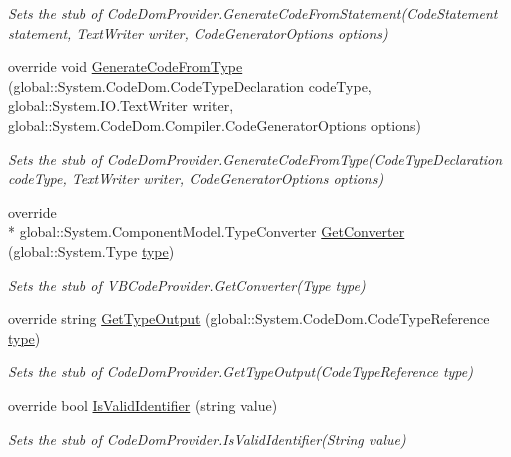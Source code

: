 \begin{DoxyCompactItemize}
\begin{DoxyCompactList}\small\item\em Sets the stub of Code\-Dom\-Provider.\-Generate\-Code\-From\-Statement(\-Code\-Statement statement, Text\-Writer writer, Code\-Generator\-Options options)\end{DoxyCompactList}\item 
override void \hyperlink{class_microsoft_1_1_visual_basic_1_1_fakes_1_1_stub_v_b_code_provider_ad29201c92d699bcfeaace4e2c91a1486}{Generate\-Code\-From\-Type} (global\-::\-System.\-Code\-Dom.\-Code\-Type\-Declaration code\-Type, global\-::\-System.\-I\-O.\-Text\-Writer writer, global\-::\-System.\-Code\-Dom.\-Compiler.\-Code\-Generator\-Options options)
\begin{DoxyCompactList}\small\item\em Sets the stub of Code\-Dom\-Provider.\-Generate\-Code\-From\-Type(\-Code\-Type\-Declaration code\-Type, Text\-Writer writer, Code\-Generator\-Options options)\end{DoxyCompactList}\item 
override \\*
global\-::\-System.\-Component\-Model.\-Type\-Converter \hyperlink{class_microsoft_1_1_visual_basic_1_1_fakes_1_1_stub_v_b_code_provider_aa2d7c13094445cc4c8d494b88de8f509}{Get\-Converter} (global\-::\-System.\-Type \hyperlink{jquery-1_810_82-vsdoc_8js_a3940565e83a9bfd10d95ffd27536da91}{type})
\begin{DoxyCompactList}\small\item\em Sets the stub of V\-B\-Code\-Provider.\-Get\-Converter(\-Type type)\end{DoxyCompactList}\item 
override string \hyperlink{class_microsoft_1_1_visual_basic_1_1_fakes_1_1_stub_v_b_code_provider_aba5f2c808d905ff9c029a60a7f2d3c89}{Get\-Type\-Output} (global\-::\-System.\-Code\-Dom.\-Code\-Type\-Reference \hyperlink{jquery-1_810_82-vsdoc_8js_a3940565e83a9bfd10d95ffd27536da91}{type})
\begin{DoxyCompactList}\small\item\em Sets the stub of Code\-Dom\-Provider.\-Get\-Type\-Output(\-Code\-Type\-Reference type)\end{DoxyCompactList}\item 
override bool \hyperlink{class_microsoft_1_1_visual_basic_1_1_fakes_1_1_stub_v_b_code_provider_a91b2d09276c77656fa4bb8fd74f8781d}{Is\-Valid\-Identifier} (string value)
\begin{DoxyCompactList}\small\item\em Sets the stub of Code\-Dom\-Provider.\-Is\-Valid\-Identifier(\-String value)\end{DoxyCompactList}\item 

\end{DoxyCompactItemize}
